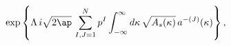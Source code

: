 \begin{equation}
\exp\left\{\Lambda\,i\sqrt{2\ap}\,
\sum_{I,J=1}^{N}
p^I\int_{-\infty}^{\infty}d\kappa\,\sqrt{A_s(\kappa)}\,
a^{-(J)}(\kappa)\right\},
\end{equation}

